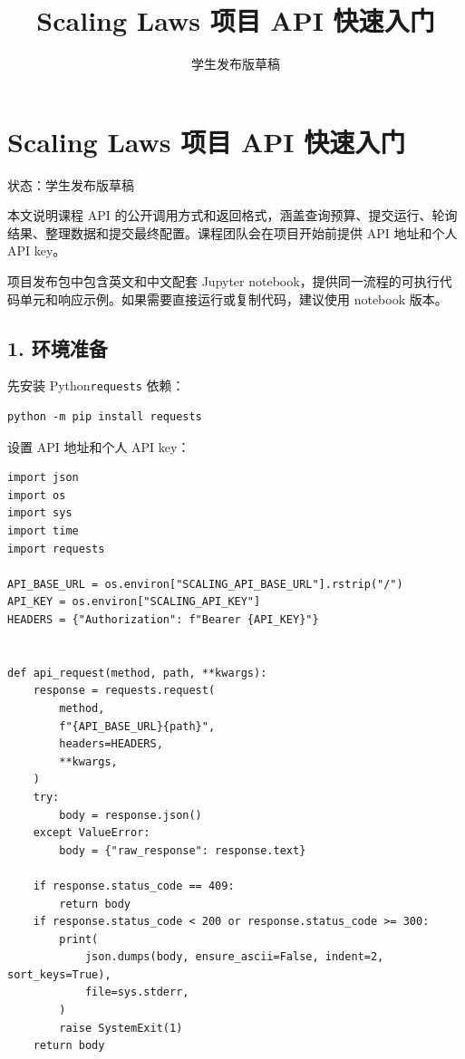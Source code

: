 \documentclass[
]{ctexart}
\title{Scaling Laws 项目 API 快速入门}
\author{}
\date{学生发布版草稿}
\newcommand{\passthrough}[1]{#1}
\begin{document}
\maketitle

{
\hypersetup{linkcolor=}
\setcounter{tocdepth}{3}
\tableofcontents
}
\hypertarget{scaling-laws-ux9879ux76ee-api-ux5febux901fux5165ux95e8}{%
\section{Scaling Laws 项目 API
快速入门}\label{scaling-laws-ux9879ux76ee-api-ux5febux901fux5165ux95e8}}

状态：学生发布版草稿

本文说明课程 API
的公开调用方式和返回格式，涵盖查询预算、提交运行、轮询结果、整理数据和提交最终配置。课程团队会在项目开始前提供
API 地址和个人 API key。

项目发布包中包含英文和中文配套 Jupyter notebook，提供同一流程的可执行代码单元和响应示例。如果需要直接运行或复制代码，建议使用
notebook 版本。

\hypertarget{ux73afux5883ux51c6ux5907}{%
\subsection{1. 环境准备}\label{ux73afux5883ux51c6ux5907}}

先安装 Python\passthrough{\lstinline!requests!} 依赖：

\begin{verbatim}
python -m pip install requests
\end{verbatim}

设置 API 地址和个人 API key：

\begin{verbatim}
import json
import os
import sys
import time
import requests

API_BASE_URL = os.environ["SCALING_API_BASE_URL"].rstrip("/")
API_KEY = os.environ["SCALING_API_KEY"]
HEADERS = {"Authorization": f"Bearer {API_KEY}"}


def api_request(method, path, **kwargs):
    response = requests.request(
        method,
        f"{API_BASE_URL}{path}",
        headers=HEADERS,
        **kwargs,
    )
    try:
        body = response.json()
    except ValueError:
        body = {"raw_response": response.text}

    if response.status_code == 409:
        return body
    if response.status_code < 200 or response.status_code >= 300:
        print(
            json.dumps(body, ensure_ascii=False, indent=2, sort_keys=True),
            file=sys.stderr,
        )
        raise SystemExit(1)
    return body
\end{verbatim}
\end{document}
